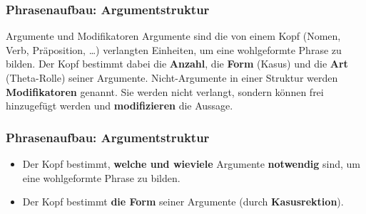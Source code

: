 \begin{frame}
\frametitle{Phrasenaufbau: Argumentstruktur}

\begin{block}{Argumente und Modifikatoren}
Argumente sind die von einem Kopf (Nomen, Verb, Präposition, \dots ) verlangten Einheiten, um eine wohlgeformte Phrase zu bilden. Der Kopf bestimmt dabei die \textbf{Anzahl}, die \textbf{Form} (\zB Kasus) und die \textbf{Art} (\zB Theta-Rolle) seiner Argumente. Nicht-Argumente in einer Struktur werden \textbf{Modifikatoren} genannt. Sie werden nicht verlangt, sondern können frei hinzugefügt werden und \textbf{modifizieren} die Aussage. 
\end{block}

\end{frame}


\begin{frame}
\frametitle{Phrasenaufbau: Argumentstruktur}

\begin{itemize}
	\item Der Kopf bestimmt, \textbf{welche und wieviele} Argumente \textbf{notwendig} sind, um eine wohlgeformte Phrase zu bilden.

\settowidth{}
\eal 
{} 
 
 
\zl

\pause

\eal
{}
\zl


\end{itemize}
\end{frame}


\begin{frame}

\begin{itemize}
	\item Der Kopf bestimmt \textbf{die Form} seiner Argumente (\zB durch \textbf{Kasusrektion}).
\end{itemize}

\eal 
{}
\zl

\pause

\eal
{}
\zl

\end{frame}


